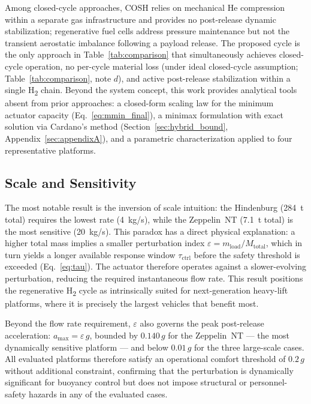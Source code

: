 \documentclass[applsci,article,submit,pdftex,moreauthors]{Definitions/mdpi}
\newcommand{\added}[1]{#1}
\begin{document}
\added{Among closed-cycle approaches, COSH relies on mechanical He compression within a separate gas infrastructure and provides no post-release dynamic stabilization; regenerative fuel cells address pressure maintenance but not the transient aerostatic imbalance following a payload release. The proposed cycle is the only approach in Table~\ref{tab:comparison} that simultaneously achieves closed-cycle operation, no per-cycle material loss (under ideal closed-cycle assumption; Table~\ref{tab:comparison}, note $d$), and active post-release stabilization within a single H\textsubscript{2} chain. Beyond the system concept, this work provides analytical tools absent from prior approaches: a closed-form scaling law for the minimum actuator capacity (Eq.~\eqref{eq:mmin_final}), a minimax formulation with exact solution via Cardano's method (Section~\ref{sec:hybrid_bound}, Appendix~\ref{sec:appendixA}), and a parametric characterization applied to four representative platforms.}

\subsection{Scale and Sensitivity}
\label{sec:scale}
The most notable result is the inversion of scale intuition: the Hindenburg (284~t total) requires the lowest rate (4~kg/s), while the Zeppelin~NT (7.1~t total) is the most sensitive (20~kg/s). This paradox has a direct physical explanation: a higher total mass implies a smaller perturbation index $\varepsilon = m_\text{load}/M_\text{total}$, which in turn yields a longer available response window $\tau_\text{ctrl}$ before the safety threshold is exceeded (Eq.~\eqref{eq:tau}). The actuator therefore operates against a slower-evolving perturbation, reducing the required instantaneous flow rate. This result positions the regenerative H\textsubscript{2} cycle as intrinsically suited for next-generation heavy-lift platforms, where it is precisely the largest vehicles that benefit most.

\added{Beyond the flow rate requirement, $\varepsilon$ also governs the peak post-release acceleration: $a_\text{max} = \varepsilon\,g$, bounded by $0.140\,g$ for the Zeppelin~NT --- the most dynamically sensitive platform --- and below $0.01\,g$ for the three large-scale cases. All evaluated platforms therefore satisfy an operational comfort threshold of $0.2\,g$ without additional constraint, confirming that the perturbation is dynamically significant for buoyancy control but does not impose structural or personnel-safety hazards in any of the evaluated cases.}
\end{document}
